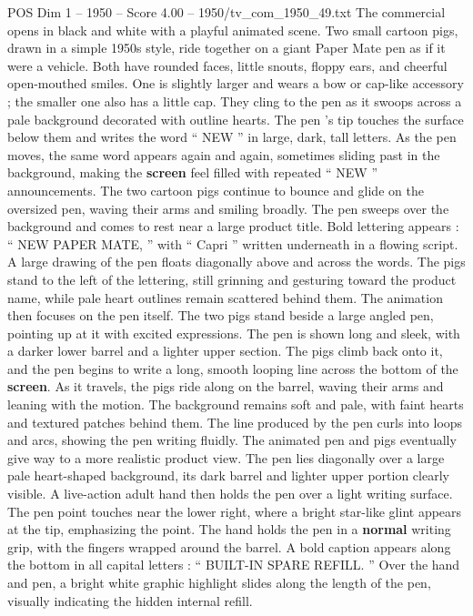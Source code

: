\begin{textsample}{POS Dim 1 – 1950 – Score 4.00 – 1950/tv\_com\_1950\_49.txt}  \label{ex:f1_pos_089}
The commercial opens in black and white with a playful animated scene.
Two small cartoon pigs, drawn in a simple 1950s style, ride together on a giant Paper Mate pen as if it were a vehicle.
Both have rounded faces, little snouts, floppy ears, and cheerful open-mouthed smiles.
One is slightly larger and wears a bow or cap-like accessory ; the smaller one also has a little cap.
They cling to the pen as it swoops across a pale background decorated with outline hearts.
The pen ’s tip touches the surface below them and writes the word “ NEW ” in large, dark, tall letters.
As the pen moves, the same word appears again and again, sometimes sliding past in the background, making the \textbf{screen} feel filled with repeated “ NEW ” announcements.
The two cartoon pigs continue to bounce and glide on the oversized pen, waving their arms and smiling broadly.
The pen sweeps over the background and comes to rest near a large product title.
Bold lettering appears : “ NEW PAPER MATE, ” with “ Capri ” written underneath in a flowing script.
A large drawing of the pen floats diagonally above and across the words.
The pigs stand to the left of the lettering, still grinning and gesturing toward the product name, while pale heart outlines remain scattered behind them.
The animation then focuses on the pen itself.
The two pigs stand beside a large angled pen, pointing up at it with excited expressions.
The pen is shown long and sleek, with a darker lower barrel and a lighter upper section.
The pigs climb back onto it, and the pen begins to write a long, smooth looping line across the bottom of the \textbf{screen}.
As it travels, the pigs ride along on the barrel, waving their arms and leaning with the motion.
The background remains soft and pale, with faint hearts and textured patches behind them.
The line produced by the pen curls into loops and arcs, showing the pen writing fluidly.
The animated pen and pigs eventually give way to a more realistic product view.
The pen lies diagonally over a large pale heart-shaped background, its dark barrel and lighter upper portion clearly visible.
A live-action adult hand then holds the pen over a light writing surface.
The pen point touches near the lower right, where a bright star-like glint appears at the tip, emphasizing the point.
The hand holds the pen in a \textbf{normal} writing grip, with the fingers wrapped around the barrel.
A bold caption appears along the bottom in all capital letters : “ BUILT-IN SPARE REFILL. ” Over the hand and pen, a bright white graphic highlight slides along the length of the pen, visually indicating the hidden internal refill.

\end{textsample}
